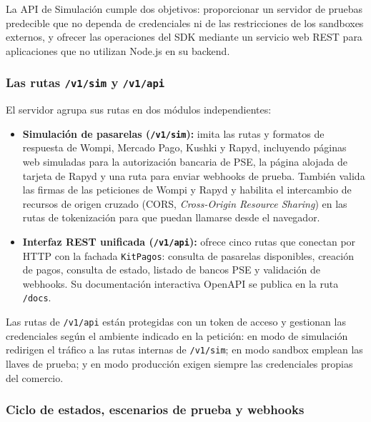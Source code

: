 La API de Simulación cumple dos objetivos: proporcionar un servidor de pruebas predecible que no dependa de credenciales ni de las restricciones de los sandboxes externos, y ofrecer las operaciones del SDK mediante un servicio web REST para aplicaciones que no utilizan Node.js en su backend.

\subsubsection{Las rutas \texttt{/v1/sim} y \texttt{/v1/api}}

El servidor agrupa sus rutas en dos módulos independientes:
\begin{itemize}
    \item \textbf{Simulación de pasarelas (\texttt{/v1/sim}):} imita las rutas y formatos de respuesta de Wompi, Mercado Pago, Kushki y Rapyd, incluyendo páginas web simuladas para la autorización bancaria de PSE, la página alojada de tarjeta de Rapyd y una ruta para enviar webhooks de prueba. También valida las firmas de las peticiones de Wompi y Rapyd y habilita el intercambio de recursos de origen cruzado (CORS, \textit{Cross-Origin Resource Sharing}) en las rutas de tokenización para que puedan llamarse desde el navegador.
    \item \textbf{Interfaz REST unificada (\texttt{/v1/api}):} ofrece cinco rutas que conectan por HTTP con la fachada \texttt{KitPagos}: consulta de pasarelas disponibles, creación de pagos, consulta de estado, listado de bancos PSE y validación de webhooks. Su documentación interactiva OpenAPI se publica en la ruta \texttt{/docs}.
\end{itemize}

Las rutas de \texttt{/v1/api} están protegidas con un token de acceso y gestionan las credenciales según el ambiente indicado en la petición: en modo de simulación redirigen el tráfico a las rutas internas de \texttt{/v1/sim}; en modo sandbox emplean las llaves de prueba; y en modo producción exigen siempre las credenciales propias del comercio.

\subsubsection{Ciclo de estados, escenarios de prueba y webhooks}

